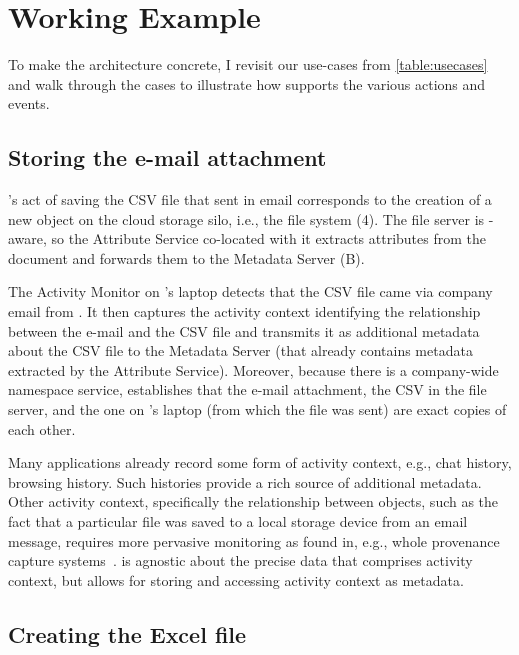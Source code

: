 \section{\system Working Example}
\label{ch:architecture:sec:working-example}

To make the \system architecture concrete, I revisit our use-cases from \autoref{table:usecases}
and walk through the cases to illustrate how \system supports the various actions and events.

\subsection{Storing the e-mail attachment}

\persa's act of saving the CSV file that \persc sent in email corresponds to the
creation of a new object on the cloud storage silo, i.e., the file system (4). The
file server is \system-aware, so the Attribute Service co-located with it extracts attributes
from the document and forwards them to the Metadata Server (B).

The Activity Monitor on \persa's laptop detects that the CSV file came via company email from
\persc. It then captures the activity context identifying the relationship
between the e-mail and the CSV file and transmits it as additional metadata
about the CSV file to the Metadata Server (that already contains metadata extracted by the
Attribute Service). Moreover, because there is a company-wide namespace service, \system
establishes that the e-mail attachment, the CSV in the file server, and the one
on \persc's laptop (from which the file was sent) are exact copies of each
other.

Many applications already record some form of activity context, e.g., chat
history, browsing history. Such histories provide a rich source of additional
metadata. Other activity context, specifically the relationship between objects,
such as the fact that a particular file was saved to a local storage device from
an email message, requires more pervasive monitoring as found in, e.g., whole
provenance capture systems~\cite{camflow}. \system is agnostic about the precise
data that comprises activity context, but allows for storing and accessing
activity context as metadata.

\subsection{Creating the Excel file}

